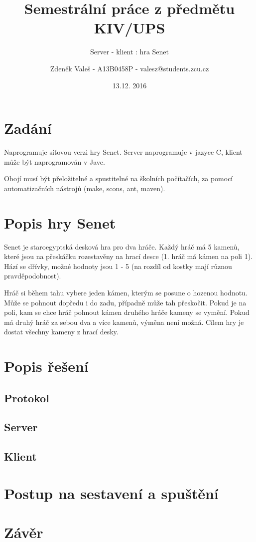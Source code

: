 \documentclass[11pt,a4paper]{scrartcl}
\begin{document}
	\title{Semestrální práce z předmětu KIV/UPS}
	\subtitle{Server - klient : hra Senet}
	\author{Zdeněk Valeš - A13B0458P - valesz@students.zcu.cz}
	\date{13.12. 2016}
	\maketitle
	\newpage
	
	\section{Zadání}
	Naprogramuje síťovou verzi hry Senet. Server naprogramuje v jazyce C, klient může být naprogramován v Jave.
	
	Obojí musí být přeložitelné a spustitelné na školních počítačích, za pomocí automatizačních nástrojů (make, scons, ant, maven).
	
	\section{Popis hry Senet}
	Senet je staroegyptská desková hra pro dva hráče. Každý hráč má 5 kamenů, které jsou na přeskáčku rozestavěny na hrací desce (1. hráč má kámen na poli 1). Hází se dřívky, možné hodnoty jsou 1 - 5 (na rozdíl od kostky mají různou pravděpodobnost). 
	
	Hráč si během tahu vybere jeden kámen, kterým se posune o hozenou hodnotu. Může se pohnout dopředu i do zadu, případně může tah přeskočit. Pokud je na poli, kam se chce hráč pohnout kámen druhého hráče kameny se vymění. Pokud má druhý hráč za sebou dva a více kamenů, výměna není možná. Cílem hry je dostat všechny kameny z hrací desky.
	
	\section{Popis řešení}
	
	\subsection{Protokol}
	
	\subsection{Server}
	
	\subsection{Klient}
	
	\section{Postup na sestavení a spuštění}
	
	\section{Závěr}
	
	
\end{document}
